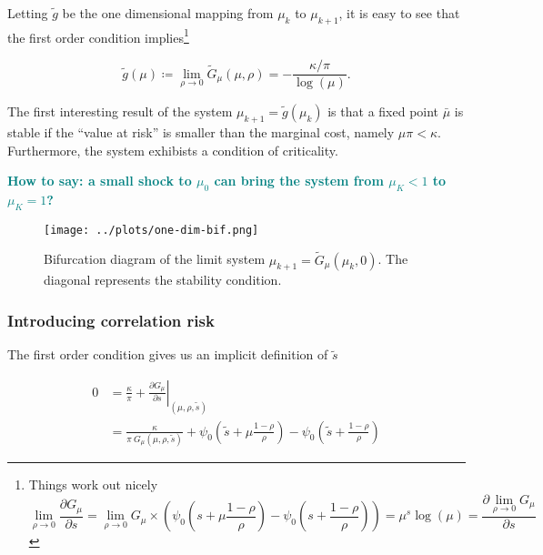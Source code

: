\documentclass[draft, american, abstract=on]{scrartcl}
\theoremstyle{plain}
\newcommand\notes[1]{\textcolor{teal}{\footnotesize \textbf{#1}}}
\begin{document}
Letting $\tilde{g}$ be the one dimensional mapping from $\mu_{k}$ to $\mu_{k + 1}$, it is easy to see that the first order condition implies\footnote{
  Things work out nicely
\begin{equation}
  \lim_{\rho \rightarrow 0} \frac{\partial G_\mu}{\partial s} = \lim_{\rho \rightarrow 0} G_\mu \times \left(\psi_0\left(s + \mu \frac{1 - \rho}{\rho} \right) - \psi_0\left(s + \frac{1 - \rho}{\rho} \right) \right) = \mu^{s} \log(\mu) = \frac{\partial \lim_{\rho \rightarrow 0} G_{\mu}}{\partial s}
\end{equation}
}

\begin{equation}
  \tilde{g}(\mu) \coloneqq \lim_{\rho \rightarrow 0}\tilde{G}_\mu(\mu, \rho) = -\frac{\kappa / \pi}{\log(\mu)}.
\end{equation}

The first interesting result of the system $\mu_{k + 1} = \tilde{g}(\mu_k)$ is that a fixed point $\bar{\mu}$ is stable if the ``value at risk'' is smaller than the marginal cost, namely $\mu \pi < \kappa$. Furthermore, the system exhibists a condition of criticality. 

\notes{How to say: a small shock to $\mu_0$ can bring the system from $\mu_{K} < 1$ to $\mu_K = 1$?}

\begin{figure}[H]
  \centering
  \texttt{[image: ../plots/one-dim-bif.png]}
  \caption{Bifurcation diagram of the limit system $\mu_{k + 1} = \tilde{G}_{\mu}(\mu_k, 0)$. The diagonal represents the stability condition.}
  \label{fig:one-dimensional-bifurcation}
\end{figure}

\subsubsection{Introducing correlation risk}

The first order condition gives us an implicit definition of $\tilde{s}$ 

\begin{equation}
  \begin{split}
    0 &= \frac{\kappa}{\pi} + \left. \frac{\partial G_\mu}{\partial s} \right\vert_{(\mu, \rho, \tilde{s})}  \\
    &= \frac{\kappa}{\pi \ G_\mu(\mu, \rho, \tilde{s})} + \psi_0\left(\tilde{s} + \mu \frac{1 - \rho}{\rho} \right) - \psi_0\left(\tilde{s} + \frac{1 - \rho}{\rho} \right)  
  \end{split}
\end{equation}
\end{document}
